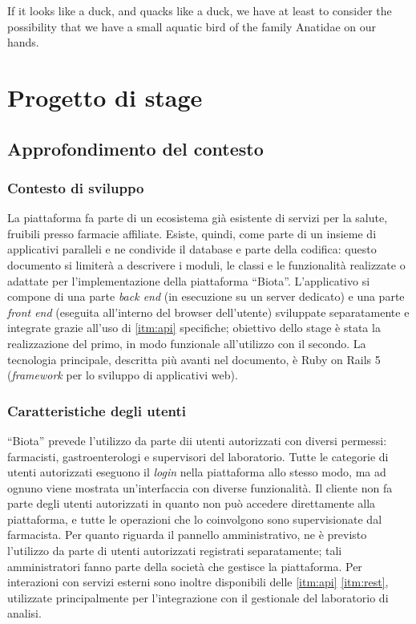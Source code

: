 
\begin{savequote}[75mm]
    If it looks like a duck, and quacks like a duck, we have at least to consider the possibility that we have a small aquatic bird of the family Anatidae on our hands.
\end{savequote}
\chapter{Progetto di stage}
\label{chap2}
\section{Approfondimento del contesto}
\subsection{Contesto di sviluppo}
\label{sec:devctx}
La piattaforma fa parte di un ecosistema già esistente di servizi per la salute, fruibili presso farmacie affiliate. Esiste, quindi, come parte di un insieme di applicativi paralleli e ne condivide il database e parte della codifica: questo documento si limiterà a descrivere i moduli, le classi e le funzionalità realizzate o adattate per l'implementazione della piattaforma ``Biota''.
L'applicativo si compone di una parte \textit{back end} (in esecuzione su un server dedicato) e una parte \textit{front end} (eseguita all'interno del browser dell'utente) sviluppate separatamente e integrate grazie all'uso di \ref{itm:api} specifiche; obiettivo dello stage è stata la realizzazione del primo, in modo funzionale all'utilizzo con il secondo. La tecnologia principale, descritta più avanti nel documento, è Ruby on Rails 5 (\textit{framework} per lo sviluppo di applicativi web).

\subsection{Caratteristiche degli utenti}
``Biota'' prevede l'utilizzo da parte dii utenti autorizzati con diversi permessi: farmacisti, gastroenterologi e supervisori del laboratorio. Tutte le categorie di utenti autorizzati eseguono il \textit{login} nella piattaforma allo stesso modo, ma ad ognuno viene mostrata un'interfaccia con diverse funzionalità. Il cliente non fa parte degli utenti autorizzati in quanto non può accedere direttamente alla piattaforma, e tutte le operazioni che lo coinvolgono sono supervisionate dal farmacista.
Per quanto riguarda il pannello amministrativo, ne è previsto l'utilizzo da parte di utenti autorizzati registrati separatamente; tali amministratori fanno parte della società che gestisce la piattaforma. Per interazioni con servizi esterni sono inoltre disponibili delle \ref{itm:api} \ref{itm:rest}, utilizzate principalmente per l'integrazione con il gestionale del laboratorio di analisi. 

